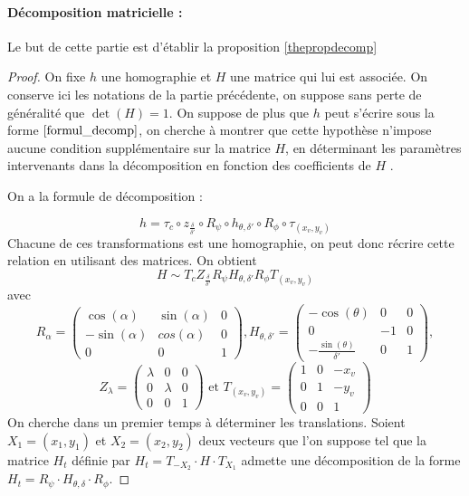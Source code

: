 \paragraph{Décomposition matricielle :}
Le but de cette partie est d'établir la proposition \ref{thepropdecomp}
\begin{proof}
On fixe $h$ une homographie et $H$ une matrice qui lui est associée. On conserve ici les notations de la partie précédente, on suppose sans perte de généralité que $\det (H)=1$. On suppose de plus que $h$ peut s'écrire sous la forme $\ref{formul_decomp}$, on cherche à montrer que cette hypothèse n'impose aucune condition supplémentaire sur la matrice $H$, en déterminant les paramètres intervenants dans la décomposition en fonction des coefficients de $H$ .

On a la formule de décomposition :

\begin{equation*}
h= \tau_{c} \circ z_{\frac{\delta}{\delta'}}\circ R_{\psi} \circ h_{\theta,\delta'} \circ R_{\phi} \circ \tau_{(x_v,y_v)}
\end{equation*}
Chacune de ces transformations est une homographie, on peut donc récrire cette relation en utilisant des matrices. On obtient 
 \begin{equation*}
H\sim T_{c} Z_{\frac{\delta}{\delta'}}  R_{\psi}  H_{\theta,\delta'} R_{\phi}  T_{(x_v,y_v)}
\end{equation*}
avec
\begin{equation*}
R_{\alpha}=\begin{pmatrix}
\cos(\alpha)&\sin(\alpha)&0\\-\sin(\alpha)&cos(\alpha)&0\\0&0&1
\end{pmatrix}
, H_{\theta,\delta'}=\begin{pmatrix}
-\cos(\theta)&0&0\\0&-1&0\\-\frac{\sin(\theta)}{\delta'}&0&1
\end{pmatrix},
\end{equation*}
\begin{equation*}
Z_{\lambda}=\begin{pmatrix}
\lambda&0&0\\0&\lambda&0\\0&0&1
\end{pmatrix}
\text{ et } T_{(x_v,y_v)}=\begin{pmatrix}
1&0&-x_{v}\\0&1&-y_{v}\\0&0&1
\end{pmatrix}
\end{equation*}
 On cherche dans un premier temps à déterminer les translations. Soient $X_1 = (x_1 , y_1 )$ et $X_2 = (x_2 , y_2 )$ deux vecteurs que l'on suppose tel que la matrice $H_t$ définie par $H_t = T_{-X_2}  \cdot H \cdot T_{X_1}$ admette une décomposition de la forme  $H_t=R_{\psi} \cdot H_{\theta,\delta} \cdot R_{\phi}$.
 

\end{proof}
